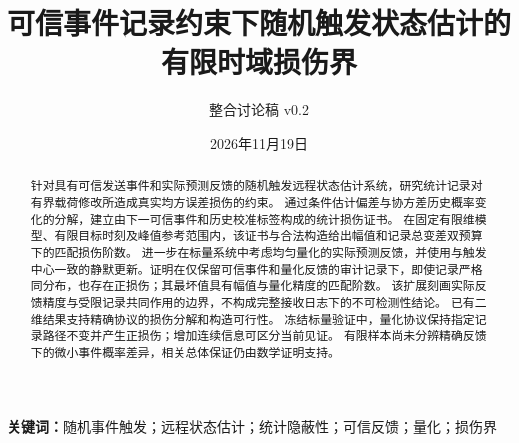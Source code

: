 \documentclass[UTF8,fontset=windows,zihao=-4]{ctexart}
\title{可信事件记录约束下随机触发状态估计的有限时域损伤界}
\author{整合讨论稿 v0.2}
\date{2026年11月19日}
\begin{document}
\maketitle
\begin{center}
\end{center}
\begin{abstract}
针对具有可信发送事件和实际预测反馈的随机触发远程状态估计系统，研究统计记录对有界载荷修改所造成真实均方误差损伤的约束。
通过条件估计偏差与协方差历史概率变化的分解，建立由下一可信事件和历史校准标签构成的统计损伤证书。
在固定有限维模型、有限目标时刻及峰值参考范围内，该证书与合法构造给出幅值和记录总变差双预算下的匹配损伤阶数。
进一步在标量系统中考虑均匀量化的实际预测反馈，并使用与触发中心一致的静默更新。证明在仅保留可信事件和量化反馈的审计记录下，即使记录严格同分布，也存在正损伤；其最坏值具有幅值与量化精度的匹配阶数。
该扩展刻画实际反馈精度与受限记录共同作用的边界，不构成完整接收日志下的不可检测性结论。
已有二维结果支持精确协议的损伤分解和构造可行性。
冻结标量验证中，量化协议保持指定记录路径不变并产生正损伤；增加连续信息可区分当前见证。
有限样本尚未分辨精确反馈下的微小事件概率差异，相关总体保证仍由数学证明支持。
\end{abstract}
\noindent\textbf{关键词：}随机事件触发；远程状态估计；统计隐蔽性；可信反馈；量化；损伤界







\appendix


\end{document}
